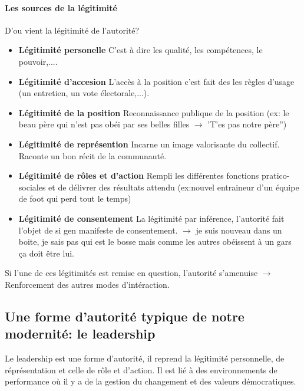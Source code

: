 \documentclass[11pt]{article} %
\begin{document}
\paragraph{Les sources de la légitimité} 

D'ou vient la légitimité de l'autorité? 

\begin{itemize}

 \item \textbf{Légitimité personelle} C'est à dire les qualité, les
compétences, le pouvoir,....

 \item \textbf{Légitimité d'accesion} L'accès à la position c'est fait des
 les règles d'usage (un entretien, un vote électorale,...).

 \item \textbf{Légitimité de la position} Reconnaissance publique de la
 position (ex: le beau père qui n'est pas obéi par ses belles filles
 $\to$ 'T'es pas notre père'')

 \item \textbf{Légitimité de représention} Incarne un image valorisante du
 collectif. Raconte un bon récit de la communauté.

 \item \textbf{Légitimité de rôles et d'action} Rempli les différentes
 fonctions pratico-sociales et de délivrer des résultats attendu
 (ex:nouvel entraineur d'un équipe de foot qui perd tout le temps)

 \item \textbf{Légitimité de consentement} La légitimité par inférence, 
 l'autorité fait l'objet de si gen manifeste de consentement.
 $\to$ je suis nouveau dans un boite, je sais pas qui est le bosse mais
 comme les autres obéissent à un gars ça doit être lui.

\end{itemize}

Si l'une de ces légitimités est remise en question, l'autorité
s'amenuise $\to$ Renforcement des autres modes d'intéraction.

\subsection{Une forme d'autorité typique de notre modernité: le leadership}
Le leadership est une forme d'autorité, il reprend la légitimité personnelle, de
réprésentation et celle de rôle et d'action. Il est lié à des environnements de
performance où il y a de la gestion du changement et des valeurs démocratiques.
\end{document}
